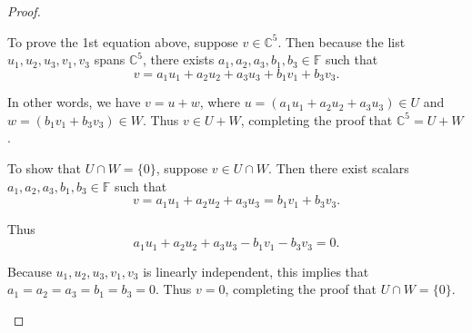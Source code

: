 \begin{proof}
\begin{enumerate}[label=(\alph*)]
To prove the 1st equation above, suppose $v\in \mathbb{C}^5$. Then because the list $u_1,u_2,u_3,v_1,v_3$ spans $\mathbb{C}^5$, there exists $a_1,a_2,a_3,b_1,b_3\in\mathbb{F}$ such that\[
v=a_1u_1+a_2u_2+a_3u_3+b_1v_1+b_3v_3.
\]

In other words, we have $v=u+w$, where $u=(a_1u_1+a_2u_2+a_3u_3)\in U$ and $w=(b_1v_1+b_3v_3)\in W$. Thus $v\in U+W$, completing the proof that $\mathbb{C}^5=U+W$.

To show that $U\cap W=\{0\}$, suppose $v\in U\cap W$. Then there exist scalars $a_1,a_2,a_3,b_1,b_3\in\mathbb{F}$ such that\[
v= a_1u_1+a_2u_2+a_3u_3=b_1v_1+b_3v_3.
\]

Thus\[
a_1u_1+a_2u_2+a_3u_3-b_1v_1-b_3v_3=0.
\]

Because $u_1,u_2,u_3,v_1,v_3$ is linearly independent, this implies that $a_1=a_2=a_3=b_1=b_3=0$. Thus $v=0$, completing the proof that $U\cap W=\{0\}$.
\end{enumerate}
\end{proof}

